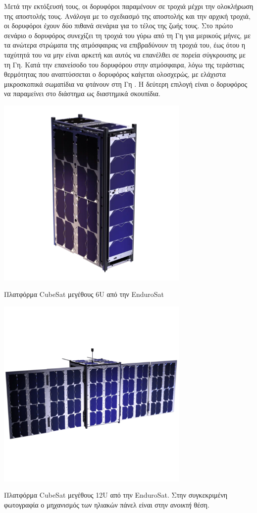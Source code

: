 \documentclass[a4paper,nobib,justified]{tufte-book}
\begin{document}
Μετά την εκτόξευσή τους, οι δορυφόροι παραμένουν σε τροχιά μέχρι την ολοκλήρωση της αποστολής τους. Ανάλογα με το σχεδιασμό της αποστολής και την αρχική τροχιά, οι δορυφόροι έχουν δύο πιθανά σενάρια για το τέλος της ζωής τους. Στο πρώτο σενάριο ο δορυφόρος συνεχίζει τη τροχιά του γύρω από τη Γη για μερικούς μήνες, με τα ανώτερα στρώματα της ατμόσφαιρας να επιβραδύνουν τη τροχιά του, έως ότου η ταχύτητά του να μην είναι αρκετή και αυτός να επανέλθει σε πορεία σύγκρουσης με τη Γη. Κατά την επανείσοδο του δορυφόρου στην ατμόσφαιρα, λόγω της τεράστιας θερμότητας που αναπτύσσεται ο δορυφόρος καίγεται ολοσχερώς, με ελάχιστα μικροσκοπικά σωματίδια να φτάνουν στη Γη . Η δεύτερη επιλογή είναι ο δορυφόρος να παραμείνει στο διάστημα ως διαστημικά σκουπίδια.

\begin{marginfigure}
	\includegraphics[width=0.7\textwidth]{media/images/endurosat-platforms/6u.png}
	\caption{Πλατφόρμα CubeSat μεγέθους 6U από την EnduroSat \parencite{6UEndurosat}}
\end{marginfigure}

\begin{marginfigure}
	\includegraphics[width=0.7\textwidth]{media/images/endurosat-platforms/12u.png}
	\caption{Πλατφόρμα CubeSat μεγέθους 12U από την EnduroSat. Στην συγκεκριμένη φωτογραφία ο μηχανισμός των ηλιακών πάνελ είναι στην \emph{ανοικτή} θέση. \parencite{12UEndurosat}}
\end{marginfigure}
\end{document}

